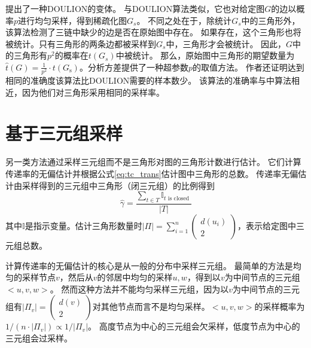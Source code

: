 \cite{etemadi2016efficient}提出了一种DOULION的变体。
与DOULION算法类似，它也对给定图$G$的边以概率$p$进行均匀采样，得到稀疏化图$G_{s}$。
不同之处在于，除统计$G_{s}$中的三角形外，该算法检测了三链中缺少的边是否在原始图中存在。
如果存在，这个三角形也将被统计。只有三角形的两条边都被采样到$G_{s}$中，三角形才会被统计。
因此，$G$中的三角形有$p^{2}$的概率在$t(G_{s})$中被统计。
那么，原始图中三角形的期望数量为$\hat{t}(G)=\frac{1}{ p^{2}} \cdot t\left(G_{\mathrm{s}}\right)$。\cite{etemadi2016efficient}分析方差提供了一种超参数$p$的取值方法。
作者还证明达到相同的准确度该算法比DOULION需要的样本数少。
该算法的准确率与\citep{pagh2012colorful}中算法相近，因为他们对三角形采用相同的采样率。

\section{基于三元组采样}
另一类方法通过采样三元组而不是三角形对图的三角形计数进行估计。
它们计算传递率的无偏估计并根据公式\ref{eq:tc_trans}估计图中三角形的总数。
传递率无偏估计由采样得到的三元组中三角形（闭三元组）的比例得到
\begin{equation}
    \hat{\gamma}=\frac{\sum_{t \in T} \mathbb{I}_{t \text { is closed }}}{|T|}
    \label{eq:app_trans}
\end{equation}
其中$\mathbb{I}$是指示变量。估计三角形数量时$|\Pi|=\sum_{i=1}^{n}\left(\begin{array}{c}
    d\left(u_{i}\right) \\
    2
    \end{array}\right)$，表示给定图中三元组总数。
    
计算传递率的无偏估计的核心是从一般的分布中采样三元组。
最简单的方法是均匀的采样节点$v$，然后从$v$的邻居中均匀的采样$u,w$，得到以$v$为中间节点的三元组$<u,v,w>$。
然而这种方法并不能均匀采样三元组，因为以$v$为中间节点的三元组有$\left|\Pi_{v}\right|=\left(\begin{array}{c}
    d(v) \\
    2
    \end{array}\right)$对其他节点而言不是均匀采样。$<u,v,w>$的采样概率为$1 /\left(n \cdot\left|\Pi_{v}\right|\right) \propto 1 /\left|\Pi_{v}\right|$。
高度节点为中心的三元组会欠采样，低度节点为中心的三元组会过采样。

